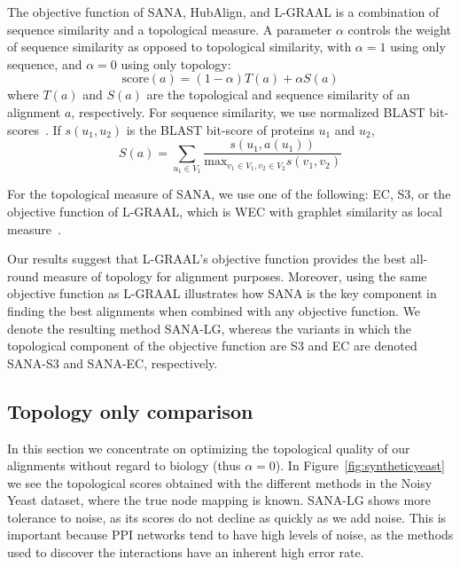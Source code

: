 \documentclass{bioinfo}
\begin{document}
The objective function of SANA, HubAlign, and L-GRAAL is a combination of sequence similarity and a topological measure. A parameter $\alpha$ controls the weight of sequence similarity as opposed to topological similarity, with $\alpha=1$ using only sequence, and $\alpha=0$ using only topology:
\begin{equation}
\mbox{score}(a) = (1-\alpha)T(a) + \alpha S(a)\label{eq:alpha}
\end{equation}
where $T(a)$ and $S(a)$ are the topological and sequence similarity of an alignment $a$, respectively. For sequence similarity, we use normalized BLAST bit-scores~\citep{blast}. If $s(u_1,u_2)$ is the BLAST bit-score of proteins $u_1$ and $u_2$,
$$S(a)=\sum_{u_1\in V_1} \frac{s(u_1,a(u_1))}{\mbox{max}_{v_1\in V_1,v_2\in V_2}s(v_1,v_2)}$$

For the topological measure of SANA, we use one of the following: EC, S3, or the objective function of L-GRAAL, which is WEC with graphlet similarity as local measure~\citep{LGRAAL}.

Our results suggest that L-GRAAL's objective function provides the best all-round measure of topology for alignment purposes. Moreover, using the same objective function as L-GRAAL illustrates how SANA is the key component in finding the best alignments when combined with any objective function. We denote the resulting method SANA-LG, whereas the variants in which the topological component of the objective function are S3 and EC are denoted SANA-S3 and SANA-EC, respectively.

\subsection{Topology only comparison}\label{top}

In this section we concentrate on optimizing the topological quality of our alignments without regard to biology (thus $\alpha=0$).
In Figure~\ref{fig:syntheticyeast} we see the topological scores obtained with the different methods in the Noisy Yeast dataset, where the true node mapping is known. SANA-LG shows more tolerance to noise, as its scores do not decline as quickly as we add noise. This is important because PPI networks tend to have high levels of noise, as the methods used to discover the interactions have an inherent high error rate.
\end{document}

